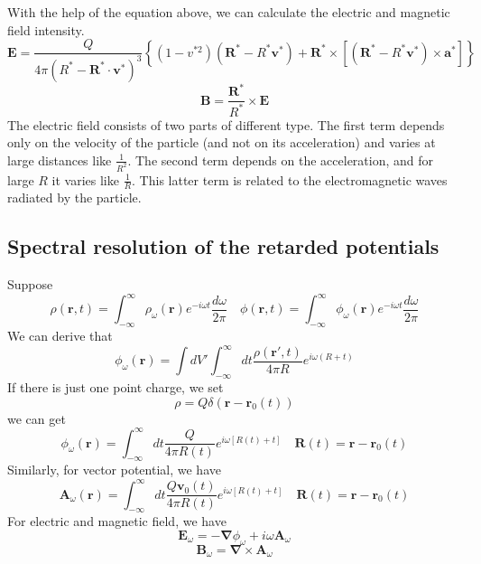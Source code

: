 \documentclass[cyan]{elegantnote}
\begin{document}
With the help of the equation above, we can calculate the electric and magnetic field intensity.
\[\bm{E} = \frac{Q}{4\pi(R^* - \bm{R}^* \cdot \bm{v}^*)^3} \left\{ (1-v^{*2})(\bm{R}^* - R^*\bm{v}^*) + \bm{R}^* \times \left[(\bm{R}^* - R^*\bm{v}^*) \times \bm{a}^* \right] \right\}\]
\[\bm{B} = \frac{\bm{R}^*}{R^*} \times \bm{E}\]
The electric field consists of two parts of different type. The first term depends only on the velocity of the particle (and not on its acceleration) and varies at large distances like $\frac{1}{R^2}$. The second term depends on the acceleration, and for large $R$ it varies like $\frac{1}{R}$. This latter term is related to the electromagnetic waves radiated by the particle.

\subsection{Spectral resolution of the retarded potentials}
Suppose
\[\rho(\bm{r},t) = \int_{-\infty}^{\infty} \rho_{\omega}(\bm{r}) e^{-i\omega t} \frac{d\omega}{2\pi} \quad \phi(\bm{r},t) = \int_{-\infty}^{\infty} \phi_{\omega}(\bm{r}) e^{-i\omega t} \frac{d\omega}{2\pi}\]
We can derive that
\[\phi_{\omega}(\bm{r}) = \int dV' \int_{-\infty}^{\infty} dt \frac{\rho(\bm{r}',t)}{4\pi R} e^{i\omega(
R+t)}\]
If there is just one point charge, we set
\[\rho = Q\delta(\bm{r} - \bm{r}_0(t))\]
we can get
\[\phi_{\omega}(\bm{r}) =  \int_{-\infty}^{\infty} dt \frac{Q}{4\pi R(t)} e^{i\omega[
R(t)+t]} \quad \bm{R}(t) =\bm{r}-\bm{r}_0(t)\]
Similarly, for vector potential, we have
\[\bm{A}_{\omega}(\bm{r}) =  \int_{-\infty}^{\infty} dt \frac{Q\bm{v}_0(t)}{4\pi R(t)} e^{i\omega[
R(t)+t]} \quad \bm{R}(t) =\bm{r}-\bm{r}_0(t)\]
For electric and magnetic field, we have
\[\bm{E}_{\omega} = -\bm{\nabla}\phi_{\omega} + i\omega \bm{A}_{\omega}\]
\[\bm{B}_{\omega} = \bm{\nabla} \times \bm{A}_{\omega}\]
\end{document}
